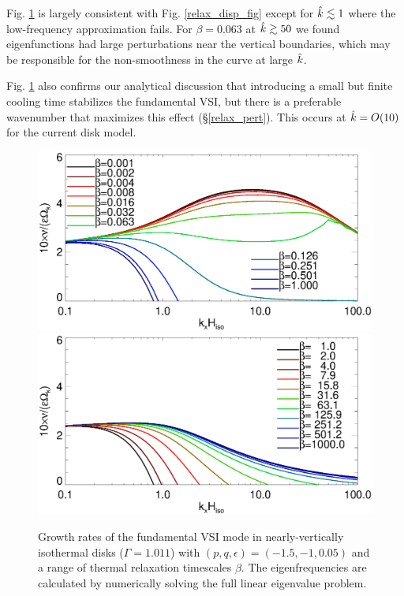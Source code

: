 
Fig. \ref{relax_growth_num} is largely consistent with 
Fig. \ref{relax_disp_fig} except for $\hat{k}\lesssim 1$
where the low-frequency approximation fails. 
For $\beta=0.063$ at $\hat{k}\gtrsim50$ we found eigenfunctions had 
large perturbations near the vertical boundaries, which may be 
responsible for the non-smoothness in the curve at large $\hat{k}$. 


Fig. \ref{relax_growth_num} also confirms our analytical discussion that
introducing a small but finite cooling time stabilizes the fundamental
VSI, but there is a preferable wavenumber that maximizes this effect (\S\ref{relax_pert}).
This occurs at $\hat{k}= O(10)$ for the current disk model. 

\begin{figure}
   \includegraphics[width=\linewidth,clip=true,trim=0cm 1.75cm 0cm 0cm]{figures/compare_eigen_imag_bloop}
  \includegraphics[width=\linewidth,clip=true,trim=0cm 0cm 0cm 1cm]{figures/compare_eigen_imag_bloop2}
  \caption{Growth rates of the fundamental VSI mode in 
    nearly-vertically isothermal disks ($\Gamma=1.011$) with
    $(p,q,\epsilon)=(-1.5,-1,0.05)$ and a range of thermal relaxation timescales 
    $\beta$. The eigenfrequencies are calculated by numerically 
    solving the full linear eigenvalue problem. \label{relax_growth_num}}   
\end{figure}   

